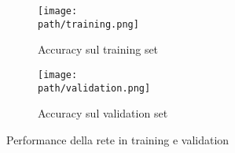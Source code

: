 \begin{figure}
\centering
\begin{subfigure}{.5\textwidth}
  \centering
 \texttt{[image: \\path/training.png]} 
  \caption{Accuracy sul training set}
 \label{fig:training}
\end{subfigure}%
\begin{subfigure}{.5\textwidth}
  \centering
 \texttt{[image: \\path/validation.png]} 
  \caption{Accuracy sul validation set}
 \label{fig:validation}
\end{subfigure}
\caption{Performance della rete in training e validation}
\label{fig:subfigure}
\end{figure}
